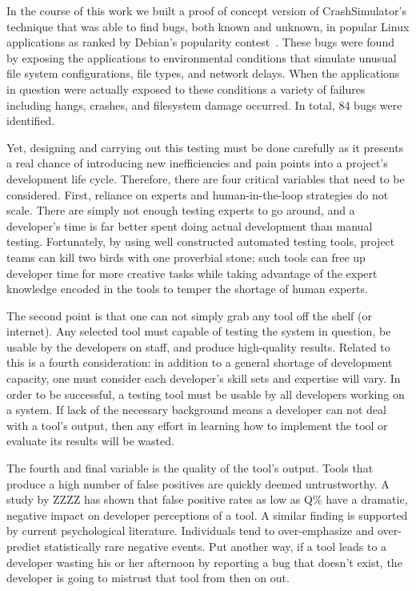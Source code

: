 In the course of this work we built a proof of concept version of
CrashSimulator's technique that was able to find bugs, both known and
unknown, in popular Linux applications as ranked by Debian's popularity
contest~\cite{DebPopCon}.  These bugs were found by exposing the
applications to environmental conditions that simulate unusual file system
configurations, file types, and network delays.  When the applications in
question were actually exposed to these conditions a variety of failures
including hangs, crashes, and filesystem damage occurred.  In total, 84
bugs were identified.

Yet, designing and carrying out this testing must be done carefully as it
presents a real chance of introducing new inefficiencies and pain points
into a project's development life cycle.  Therefore, there are four
critical variables that need to be considered.
First, reliance on experts and
human-in-the-loop strategies do not scale.  There are
simply not enough testing experts to go around,
and a developer's time is far
better spent doing actual development than manual testing.  Fortunately, by using well constructed automated
testing tools, project teams can kill two birds with one proverbial stone;
such tools can free up developer time for more creative tasks while taking
advantage of the expert knowledge encoded in the tools to temper the
shortage of human experts.


The second point is that one can not simply grab any tool off the shelf (or
internet).  Any selected tool must capable of testing the system in
question, be usable by the developers on staff, and produce
high-quality results.  Related to this is a fourth consideration: in
addition to a general shortage of development capacity, one must consider
each developer's skill sets and expertise will vary.
In order to be successful, a
testing tool must be usable by all developers working on a system. If
lack of the necessary background means a developer can not
deal with a tool's output,
then any effort in learning how to implement the tool or  evaluate its
results will be wasted.

The fourth and final variable is the quality of the tool's output.  Tools
that produce a high number of false positives are quickly deemed
untrustworthy.  A study by ZZZZ has shown that false positive rates as low
as Q\% have a dramatic, negative impact on developer perceptions of a tool.
  A similar finding is supported by current psychological
literature.  Individuals tend to over-emphasize and over-predict
statistically rare negative events.  Put another way, if a
tool leads to a developer wasting his or her afternoon by reporting a bug
that doesn't exist, the developer is going to mistrust that tool from then
on out.

